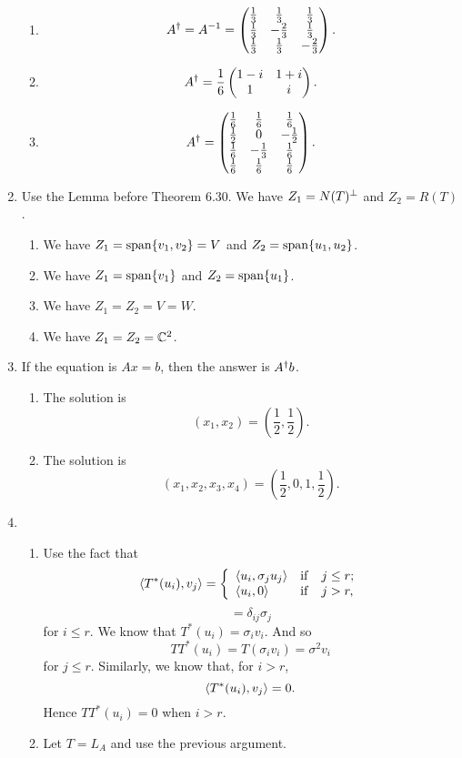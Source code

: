 \begin{enumerate}
\begin{enumerate}
\item 
\[A\da=A^{-1}=\begin{pmatrix}\frac{1}{3} & \frac{1}{3} & \frac{1}{3}\cr \frac{1}{3} & -\frac{2}{3} & \frac{1}{3}\cr \frac{1}{3} & \frac{1}{3} & -\frac{2}{3}\end{pmatrix}.\]
\item 
\[A\da=\frac{1}{6}\begin{pmatrix}1-i&1+i\\1&i\end{pmatrix}.\]
\item 
\[A\da=\begin{pmatrix}\frac{1}{6} & \frac{1}{6} & \frac{1}{6}\cr \frac{1}{2} & 0 & -\frac{1}{2}\cr \frac{1}{6} & -\frac{1}{3} & \frac{1}{6}\cr \frac{1}{6} & \frac{1}{6} & \frac{1}{6}\end{pmatrix}.\]
\end{enumerate}
\item Use the Lemma before Theorem 6.30. We have $Z_1=N(T)\pp$ and $Z_2=R(T)$.
\begin{enumerate}
\item We have $Z_1=\sp\{v_1,v_2\}=V$ and $Z_2=\sp\{u_1,u_2\}$.
\item We have $Z_1=\sp\{v_1\}$ and $Z_2=\sp\{u_1\}$.
\item We have $Z_1=Z_2=V=W$.
\item We have $Z_1=Z_2=\C^2$.
\end{enumerate}
\item If the equation is $Ax=b$, then the answer is $A\da b$.
\begin{enumerate}
\item The solution is 
\[(x_1,x_2)=(\frac{1}{2},\frac{1}{2}).\]
\item The solution is 
\[(x_1,x_2,x_3,x_4)=(\frac{1}{2},0,1,\frac{1}{2}).\]
\end{enumerate}
\item \begin{enumerate}
\item Use the fact that 
\[\lag T^*(u_i),v_j\rag =\left\{\begin{array}{lll}\lag u_i,\sigma_ju_j\rag &\mathrm{if}&j\leq r;\\\lag u_i,0\rag &\mathrm{if}&j>r,\end{array}\right.\]
\[=\delta_{ij}\sigma_j\]
for $i\leq r$. We know that $T^*(u_i)=\sigma_iv_i$. And so 
\[TT^*(u_i)=T(\sigma_iv_i)=\sigma^2v_i\]
for $j\leq r$. Similarly, we know that, for $i>r$, 
\[\lag T^*(u_i),v_j\rag =0.\]
Hence $TT^*(u_i)=0$ when $i>r$.
\item Let $T=L_A$ and use the previous argument.

\end{enumerate}
\end{enumerate}
